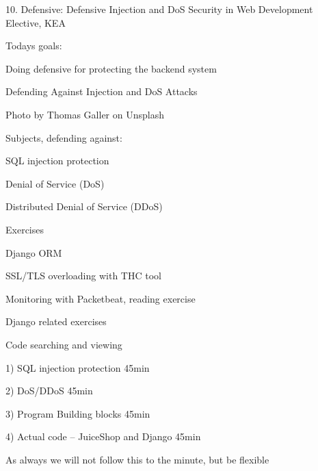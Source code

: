 \documentclass[Screen16to9,17pt]{foils}
\begin{document}
\mytitlepage
{10. Defensive: Defensive Injection and DoS}
{Security in Web Development Elective, KEA}




Todays goals:
\begin{list2}
\item Doing defensive for protecting the backend system
\item Defending Against Injection and DoS Attacks
\end{list2}

Photo by Thomas Galler on Unsplash




\begin{list1}
\item Subjects, defending against:
\begin{list2}
\item SQL injection protection
\item Denial of Service (DoS)
\item Distributed Denial of Service (DDoS)
\end{list2}
\item Exercises
\begin{list2}
\item Django ORM
\item SSL/TLS overloading with THC tool
\item Monitoring with Packetbeat, reading exercise
\item Django related exercises
\item Code searching and viewing
\end{list2}
\end{list1}


\begin{list2}
\item 1) SQL injection protection 45min
\item 2) DoS/DDoS 45min
\item 3) Program Building blocks 45min
\item 4) Actual code -- JuiceShop and Django 45min
\end{list2}

As always we will not follow this to the minute, but be flexible

\end{document}
